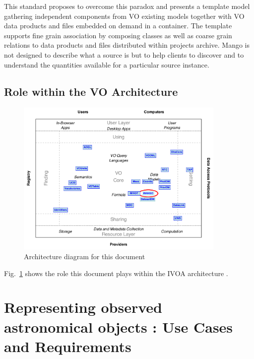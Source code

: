 \documentclass[11pt,a4paper]{ivoa}
\begin{document}
This standard proposes to overcome this paradox and presents a template model gathering independent components from VO existing models
together with VO data products and files embedded on demand in a container.
The template supports fine grain association by composing classes as well as coarse grain relations to data products and files distributed within projects archive.
Mango is not designed to describe what a source is but to help clients to discover and to understand the quantities available for a particular source instance.

\subsection{Role within the VO Architecture}

\begin{figure}
\centering


\includegraphics[width=0.9\textwidth]{role_diagram.pdf}
\caption{Architecture diagram for this document}
\label{fig:archdiag}
\end{figure}

Fig.~\ref{fig:archdiag} shows the role this document plays within the
IVOA architecture \citep{2010ivoa.rept.1123A}.



\section{Representing observed astronomical objects : Use Cases and  Requirements}
\end{document}
